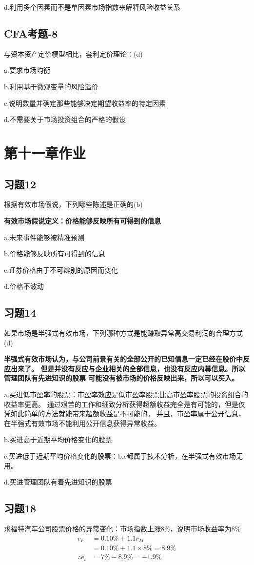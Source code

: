 \documentclass{article}
\begin{document}
d.利用多个因素而不是单因素市场指数来解释风险收益关系

\subsection*{CFA考题-8}
与资本资产定价模型相比，套利定价理论：(d)

a.要求市场均衡

b.利用基于微观变量的风险溢价

c.说明数量并确定那些能够决定期望收益率的特定因素

d.不需要关于市场投资组合的严格的假设

\clearpage
\section*{\center 第十一章作业}
\subsection*{习题12}
根据有效市场假说，下列哪些陈述是正确的(b)

\textbf{有效市场假说定义：价格能够反映所有可得到的信息}

a.未来事件能够被精准预测

b.价格能够反映所有可得到的信息

c.证券价格由于不可辨别的原因而变化

d.价格不波动
\subsection*{习题14}
如果市场是半强式有效市场，下列哪种方式是能赚取异常高交易利润的合理方式(d)

\textbf{半强式有效市场认为，与公司前景有关的全部公开的已知信息一定已经在股价中反应出来了。
但是并没有反应与企业相关的全部信息，也没有反应内幕信息。所以管理团队有先进知识的股票
可能没有被市场的价格反映出来，所以可以买入。}

a.买进低市盈率的股票：市盈率效应是低市盈率股票比高市盈率股票的投资组合的收益率更高。
通过艰苦的工作和细致分析获得超额收益完全是有可能的，但是仅凭如此简单的方法就能带来超额收益是不可能的。
并且，市盈率属于公开信息，在半强式有效市场不能利用公开信息获得异常收益。

b.买进高于近期平均价格变化的股票

c.买进低于近期平均价格变化的股票：b,c都属于技术分析，在半强式有效市场无用。

d.买进管理团队有着先进知识的股票

\subsection*{习题18}
求福特汽车公司股票价格的异常变化：市场指数上涨8\%，说明市场收益率为8\%
\begin{align}
    r_F&=0.10\%+1.1r_M\\
     &=0.10\%+1.1\times 8\%=8.9\%\\
     \therefore e_t&=7\%-8.9\%=-1.9\%
\end{align}
\end{document}
